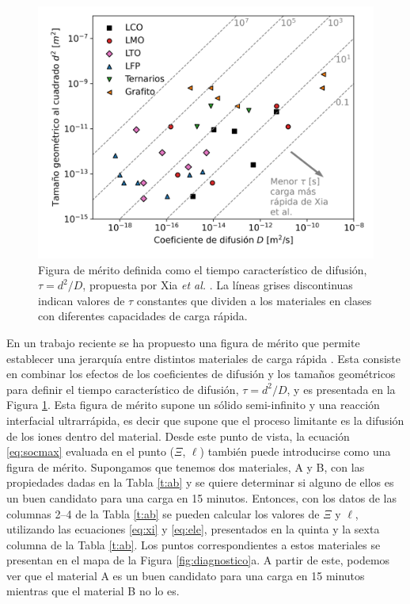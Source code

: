 \begin{figure}[t]
    \centering
    \includegraphics[width=.7\textwidth]{FastCharging/un/introduccion/xiafom.png}
    \caption{Figura de mérito definida como el tiempo característico de difusión, 
    $\tau = d^2/D$, propuesta por Xia \textit{et al.} \cite{xia2022}. La líneas
    grises discontinuas indican valores de $\tau$ constantes que dividen a los 
    materiales en clases con diferentes capacidades de carga rápida.}
    \label{fig:xiafom}
\end{figure}
En un trabajo reciente se ha propuesto una figura de mérito que permite establecer 
una jerarquía entre distintos materiales de carga rápida \cite{xia2022}. 
Esta consiste en combinar los efectos de los coeficientes de difusión y los 
tamaños geométricos para definir el tiempo característico de difusión, 
$\tau = d^2 / D$, y es presentada en la Figura \ref{fig:xiafom}. Esta figura de 
mérito supone un sólido semi-infinito y una reacción interfacial ultrarrápida, 
es decir que supone que el proceso limitante es la difusión de los iones dentro 
del material.
Desde
este punto de vista, la ecuación \ref{eq:socmax} evaluada en el punto ($\Xi$, 
$\ell$) también puede introducirse como una figura de mérito. Supongamos que 
tenemos dos materiales, A y B, con las propiedades dadas en la Tabla \ref{t:ab} y 
se quiere determinar si alguno de ellos es un buen candidato para una carga en 15 
minutos. Entonces, con los datos de las columnas 2--4 de la Tabla \ref{t:ab} 
se pueden calcular los valores de $\Xi$ y $\ell$, utilizando las ecuaciones 
\ref{eq:xi} y \ref{eq:ele}, presentados en la quinta y la sexta columna de la 
Tabla \ref{t:ab}. Los puntos correspondientes a estos materiales se presentan en 
el mapa de la Figura \ref{fig:diagnostico}a. A partir de este, podemos ver que el 
material A es un buen candidato para una carga en 15 minutos mientras que el 
material B no lo es.
